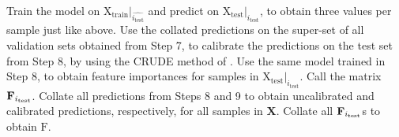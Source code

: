 \begin{algorithm}
\begin{algorithmic}[1]
\STATE Train the model on $\boldsymbol{\mathrm{X_{train}}}\vert_{\hat{i_\mathrm{test}}}$ and predict on $\boldsymbol{\mathrm{X_{test}}}\vert_{i_\mathrm{test}}$, to obtain three values per sample just like above.
\STATE Use the collated predictions on the super-set of all validation sets obtained from Step 7, to calibrate the predictions on the test set from Step 8, by using the CRUDE method of \cite{crude_probability_calibration}.
\STATE Use the same model trained in Step 8, to obtain feature importances for samples in $\boldsymbol{\mathrm{X_{test}}}\vert_{i_\mathrm{test}}$. Call the matrix $\boldsymbol{\mathrm{F}}_{i_{\rm test}}$.
\ENDFOR
\STATE Collate all predictions from Steps 8 and 9 to obtain uncalibrated and calibrated predictions, respectively, for all samples in $\mathbf{X}$.
\STATE Collate all $\boldsymbol{\mathrm{F}}_{i_{\rm test}}$s to obtain $\boldsymbol{\mathrm{F}}$.
\end{algorithmic} 
\end{algorithm}
\fi

